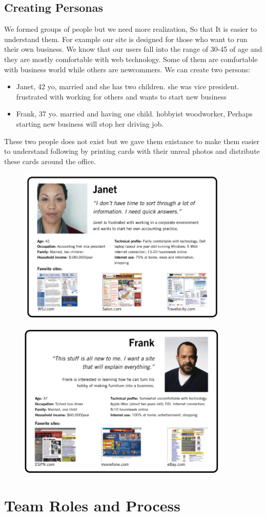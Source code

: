 \subsection{Creating Personas}
We formed groups of people but we need more realization, So that It is easier to understand them. For example our site is designed for those who want 
to run their own business. We know that our users fall into the range of 30-45 of age and they are mostly comfortable with web technology. Some of them are 
comfortable with business world while others are newcommers. We can create two persons:
\begin{itemize}
    \item Janet, 42 yo, married and she has two children. she was vice president. frustrated with working for others and wants to start new business
    \item Frank, 37 yo. married and having one child. hobbyist woodworker, Perhaps starting new business will stop her driving job.
\end{itemize}
These two people does not exist but we gave them existance to make them easier to understand following by printing cards with their 
unreal photos and distribute these cards around the office.
\begin{figure}
    \centering
        \includegraphics[width=10cm]{images/pic4.png}
    \label{Janet}
\end{figure}
\begin{figure}[]
    \centering
        \includegraphics[width=10cm]{images/pic5.png}
    \caption{}
    \label{Frank}
\end{figure}
\section{Team Roles and Process}
